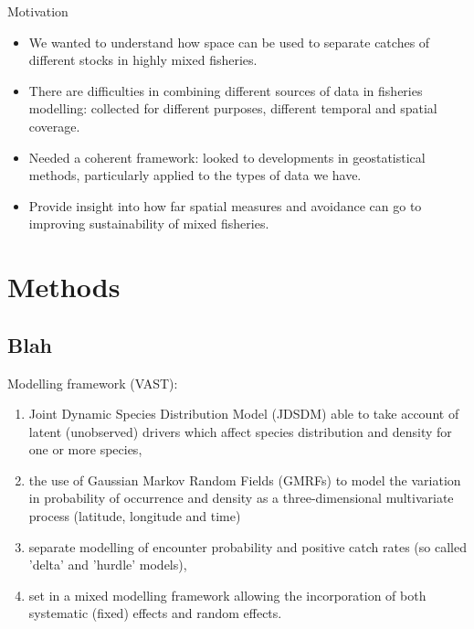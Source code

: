 \documentclass[xcolor=x11names,compress]{beamer}
\renewcommand{\(}{\begin{columns}}
\renewcommand{\)}{\end{columns}}
\newcommand{\<}[1]{\begin{column}{#1}}
\renewcommand{\>}{\end{column}}
\begin{document}
\begin{frame}{Motivation}
	
\begin{itemize}
\small	
\setlength\itemsep{1em}

	\item We wanted to understand how space can be used to separate catches
		of different stocks in highly mixed fisheries. \pause
	\item There are difficulties in combining different sources of data in
		fisheries modelling: collected for different purposes,
		different temporal and spatial coverage. \pause
	\item Needed a coherent framework: looked to developments in
		geostatistical methods, particularly applied to the types of
		data we have. \pause
	\item Provide insight into how far spatial measures and avoidance can
		go to improving sustainability of mixed fisheries.
\end{itemize}

\end{frame}


\section{Methods}
\subsection{Blah}

\begin{frame}

Modelling framework (VAST):
\pause

\begin{enumerate}
	\small
	\setlength\itemsep{2em}

	\item Joint Dynamic Species Distribution Model (JDSDM) able to take
		account of latent (unobserved) drivers which affect species
		distribution and density for one or more species, \pause
	\item the use of Gaussian Markov Random Fields (GMRFs) to model the
		variation in probability of occurrence and density as a
		three-dimensional multivariate process (latitude, longitude and
		time) \pause
	\item separate modelling of encounter probability and positive catch
		rates (so called 'delta' and 'hurdle' models),  \pause
	\item set in a mixed modelling framework allowing the incorporation of
		both systematic (fixed) effects and random effects. 
	
\end{enumerate}

\end{frame}
\end{document}

